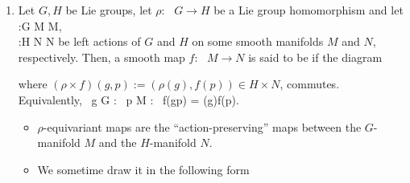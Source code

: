 \documentclass{article}
\newcommand{\cl}{:\text{ }}
\begin{document}
\begin{enumerate}
\item {} Let $G,H$ be Lie groups, let $\rho\cl G\to H$ be a Lie group homomorphism and let
\lacts \cl G \times M \to M,\\
\blacktriangleright \cl H \times N \to N
\ei
be left actions of $G$ and $H$ on some smooth manifolds $M$ and $N$, respectively. Then, a smooth map $f\cl M\to N$ is said to be  if the diagram
\bse
{}
\ese
where $(\rho\times f)(g,p) := (\rho(g),f(p))\in H\times N$, commutes. Equivalently,
\bse
\forall \, g \in G : \forall \, p \in M : \ f(g\lacts p) = \rho(g)\blacktriangleright f(p).
\ese
\begin{itemize}
    \item $\rho$-equivariant maps are the ``action-preserving'' maps between the $G$-manifold $M$ and the $H$-manifold $N$.
     \item {} We sometime draw it in the following form\bse
\ese
     

\end{itemize}
\end{enumerate}
\end{document}
